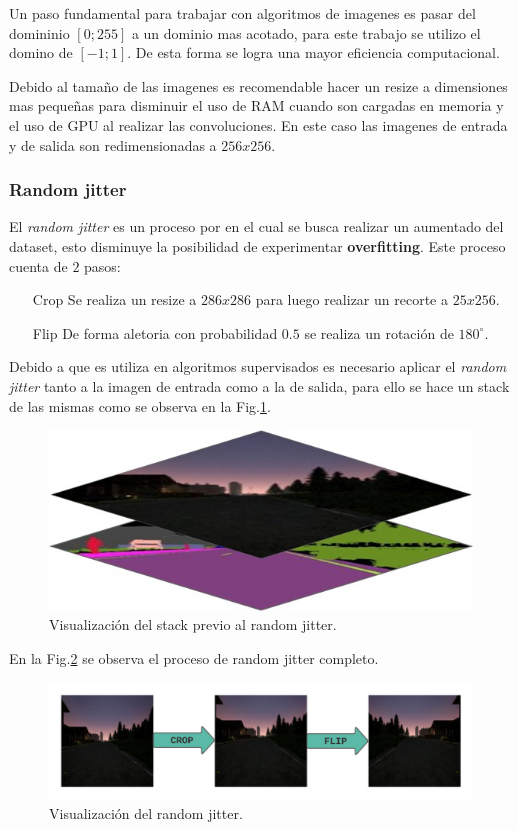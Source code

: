 \documentclass[]{IEEEtran}
\begin{document}
    Un paso fundamental para trabajar con algoritmos de imagenes es pasar del domininio $[0;255]$ a 
    un dominio mas acotado, para este trabajo se utilizo el domino de $[-1;1]$. De esta forma se logra 
    una mayor eficiencia computacional.

    Debido al tamaño de las imagenes es recomendable hacer un resize a dimensiones mas pequeñas 
    para disminuir el uso de RAM cuando son cargadas en memoria y el uso de GPU al realizar las convoluciones. En 
    este caso las imagenes de entrada y de salida son redimensionadas a $256x256$.

    \subsubsection{Random jitter}

    El \textit{random jitter} es un proceso por en el cual se busca realizar un aumentado
    del dataset, esto disminuye la posibilidad de experimentar \textbf{overfitting}. 
    Este proceso cuenta de $2$ pasos:

    \begin{itemize}
        \item[Crop] Se realiza un resize a $286x286$ para luego realizar un recorte a $25x256$.
        \item[Flip] De forma aletoria con probabilidad $0.5$ se realiza un rotación de $180^\circ$. 
    \end{itemize}

    Debido a que es utiliza en algoritmos supervisados es necesario aplicar 
    el \textit{random jitter} tanto a la imagen de entrada como a la de salida,
    para ello se hace un stack de las mismas como se observa en la Fig.\ref{fig:random-jitter}.

    \begin{figure}
        \centering
        \includegraphics[width=.4\textwidth]{Imgs/stack-random-jitter.jpeg}
        \caption{Visualización del stack previo al random jitter.}
        \label{fig:random-jitter}
    \end{figure}

    En la Fig.\ref{fig:crop-flip} se observa el proceso de random jitter completo.

    \begin{figure}
        \centering
        \includegraphics[width=.4\textwidth]{Imgs/in_crop_flip.png}
        \caption{Visualización del random jitter.}
        \label{fig:crop-flip}
    \end{figure}
\end{document}
